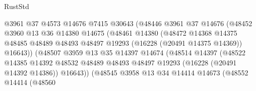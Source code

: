 \begin{lexlean}{RustStd}
\begin{coremodule}
                                  @3961
                                  @37
                                  @4573
                                  @14676
                                  @7415
                                  @30643
                                  (@48446
                                    @3961
                                    @37
                                    @14676
                                    (@48452
                                      @3960
                                      @13
                                      @36
                                      @14380
                                      @14675
                                      (@48461
                                        @14380
                                        (@48472
                                          @14368
                                          @14375
                                          @48485
                                          @48489
                                          @48493
                                          @48497
                                          @19293
                                          (@16228 (@20491 @14375 @14369))
                                          @16643))
                                      (@48507
                                        @3959
                                        @13
                                        @35
                                        @14397
                                        @14674
                                        (@48514
                                          @14397
                                          (@48522
                                            @14385
                                            @14392
                                            @48532
                                            @48489
                                            @48493
                                            @48497
                                            @19293
                                            (@16228 (@20491 @14392 @14386))
                                            @16643))
                                        (@48545
                                          @3958
                                          @13
                                          @34
                                          @14414
                                          @14673
                                          (@48552
                                            @14414
                                            (@48560

\end{coremodule}
\end{lexlean}
